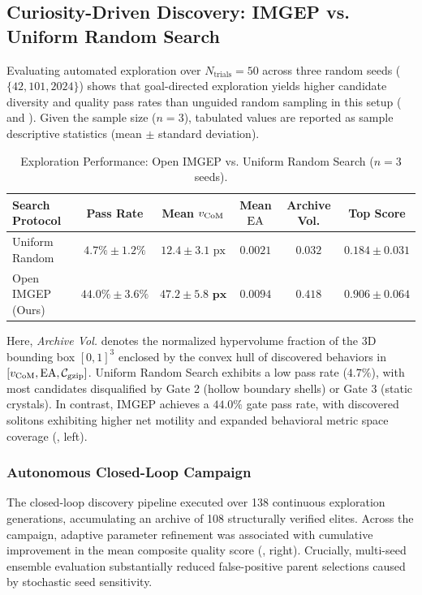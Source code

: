\subsection{Curiosity-Driven Discovery: IMGEP vs. Uniform Random Search}
\label{subsec:res_imgep_vs_random}

Evaluating automated exploration over $N_{\text{trials}} = 50$ across three random seeds ($\{42, 101, 2024\}$) shows that goal-directed exploration yields higher candidate diversity and quality pass rates than unguided random sampling in this setup ( and ). Given the sample size ($n=3$), tabulated values are reported as sample descriptive statistics (mean $\pm$ standard deviation).

\begin{table}[htbp]
\centering
\footnotesize
\caption{Exploration Performance: Open IMGEP vs. Uniform Random Search ($n = 3$ seeds).}
\label{tab:results_imgep_vs_random}
\begin{tabularx}{\textwidth}{lccccc}
\toprule
\textbf{Search Protocol} & \textbf{Pass Rate} & \textbf{Mean $v_{\text{CoM}}$} & \textbf{Mean $\text{EA}$} & \textbf{Archive Vol.} & \textbf{Top Score} \\
\midrule
Uniform Random & $4.7\% \pm 1.2\%$ & $12.4 \pm 3.1\text{ px}$ & $0.0021$ & $0.032$ & $0.184 \pm 0.031$ \\
Open IMGEP (Ours) & $\mathbf{44.0\% \pm 3.6\%}$ & $\mathbf{47.2 \pm 5.8\text{ px}}$ & $\mathbf{0.0094}$ & $\mathbf{0.418}$ & $\mathbf{0.906 \pm 0.064}$ \\
\bottomrule
\end{tabularx}
\end{table}

Here, \textit{Archive Vol.} denotes the normalized hypervolume fraction of the 3D bounding box $[0, 1]^3$ enclosed by the convex hull of discovered behaviors in $[v_{\text{CoM}}, \text{EA}, \mathcal{C}_{\text{gzip}}]$. Uniform Random Search exhibits a low pass rate ($4.7\%$), with most candidates disqualified by Gate 2 (hollow boundary shells) or Gate 3 (static crystals). In contrast, IMGEP achieves a $44.0\%$ gate pass rate, with discovered solitons exhibiting higher net motility and expanded behavioral metric space coverage (, left).

\subsubsection{Autonomous Closed-Loop Campaign}
The closed-loop discovery pipeline executed over 138 continuous exploration generations, accumulating an archive of 108 structurally verified elites. Across the campaign, adaptive parameter refinement was associated with cumulative improvement in the mean composite quality score (, right). Crucially, multi-seed ensemble evaluation substantially reduced false-positive parent selections caused by stochastic seed sensitivity.

